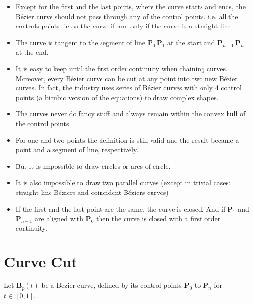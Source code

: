 \documentclass[12pt]{article}
\begin{document}
\begin{itemize}
\item Except for the first and the last points, where the curve starts and ends, the B\'ezier curve should not pass through any of the control points. i.e. all the controls points lie on the curve if and only if the curve is a straight line.

\item The curve is tangent to the segment of line $\overline{\boldsymbol{P}_0 \, \boldsymbol{P}_1}$ at the start and $\overline{\boldsymbol{P}_{n-1} \, \boldsymbol{P}_n}$ at the end.

\item It is easy to keep until the first order continuity when chaining curves. Moreover, every B\'ezier curve can be cut at any point into two new B\'ezier curves. In fact, the  industry uses series of B\'ezier curves with only 4 control points (a bicubic version of the equations) to draw complex shapes.

\item The curves never do fancy stuff and always remain within the convex hull of the control points.

\item For one and two points the definition is still valid and the result became a point and a segment of line, respectively.

\item But it is impossible to draw circles or arcs of circle.

\item It is also impossible to draw two parallel curves (except in trivial cases: straight line B\'eziers and coincident B\'eziers curves)

\item If the first and the last point are the same, the curve is closed. And if $\boldsymbol{P}_1$ and $\boldsymbol{P}_{n-1}$ are aligned with $\boldsymbol{P}_0$ then the curve is closed with a first order continuity.

\end{itemize}

\section{Curve Cut}

Let $\boldsymbol{B}_p(t)$ be a Bezier curve, defined by its control points $\boldsymbol{P}_0$ to $\boldsymbol{P}_{n}$ for $t \in [0,1]$.
\end{document}
